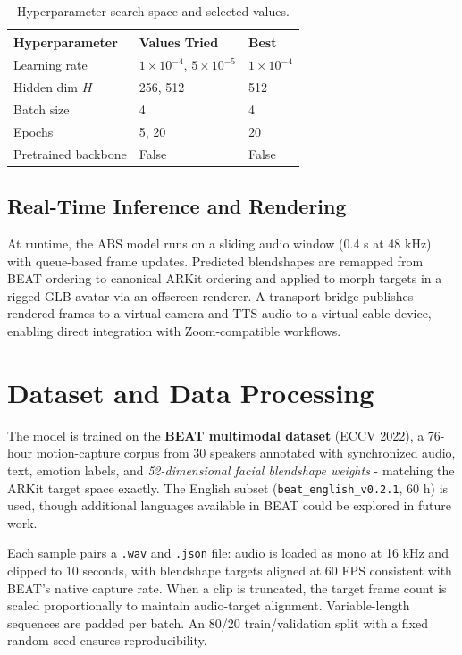 \begin{table}[h]
\centering
\caption{Hyperparameter search space and selected values.}
\label{tab:hparam}
\small
\begin{tabular}{lll}
\hline
\textbf{Hyperparameter} & \textbf{Values Tried} & \textbf{Best} \\
\hline
Learning rate        & $1\times10^{-4}$, $5\times10^{-5}$ & $1\times10^{-4}$ \\
Hidden dim $H$       & 256, 512                            & 512 \\
Batch size           & 4                                   & 4   \\
Epochs               & 5, 20                               & 20  \\
Pretrained backbone  & False                               & False \\
\hline
\end{tabular}
\end{table}

\subsection{Real-Time Inference and Rendering}

At runtime, the ABS model runs on a sliding audio window (0.4 s at 48 kHz) with queue-based frame updates. Predicted blendshapes are remapped from BEAT ordering to canonical ARKit ordering and applied to morph targets in a rigged GLB avatar via an offscreen renderer. A transport bridge publishes rendered frames to a virtual camera and TTS audio to a virtual cable device, enabling direct integration with Zoom-compatible workflows.

\section{Dataset and Data Processing}

The model is trained on the \textbf{BEAT multimodal dataset} \cite{liu2022beat} (ECCV 2022), a 76-hour motion-capture corpus from 30 speakers annotated with synchronized audio, text, emotion labels, and \textit{52-dimensional facial blendshape weights} - matching the ARKit target space exactly. The English subset (\texttt{beat\_english\_v0.2.1}, 60 h) is used, though additional languages available in BEAT could be explored in future work.

Each sample pairs a \texttt{.wav} and \texttt{.json} file: audio is loaded as mono at 16 kHz and clipped to 10 seconds, with blendshape targets aligned at 60 FPS consistent with BEAT's native capture rate. When a clip is truncated, the target frame count is scaled proportionally to maintain audio-target alignment. Variable-length sequences are padded per batch. An 80/20 train/validation split with a fixed random seed ensures reproducibility.

